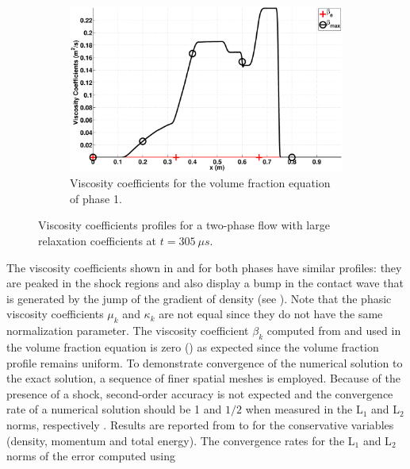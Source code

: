 \documentclass[preprint,10pt]{elsarticle}
\begin{document}
\begin{figure}[H]
        \begin{subfigure}[b]{0.495\textwidth}
                \centering
                \includegraphics[width=\textwidth]{figures/two_phases_liquid_beta.eps}
                \caption{Viscosity coefficients for the volume fraction equation of phase 1.}
                \label{fig:indp-phase-beta}
        \end{subfigure}        
        \caption{Viscosity coefficients profiles for a two-phase flow with large relaxation coefficients at $t=305 \ \mu s$.}\label{fig:indp-phase-visc-coeff}
\end{figure}
%
The viscosity coefficients shown in  and  for both phases have similar profiles: they are peaked in the shock regions and also display a bump in the contact wave that is generated by the jump of the gradient of density (see ). Note that the phasic viscosity coefficients $\mu_k$ and $\kappa_k$ are not equal since they do not have the same normalization parameter. The viscosity coefficient $\beta_k$ computed from  and used in the volume fraction equation is zero () as expected since the volume fraction profile remains uniform. 
To demonstrate convergence of the numerical solution to the exact solution, a sequence of finer spatial meshes is employed. Because 
of the presence of a shock, second-order accuracy is not expected and the convergence rate of a numerical solution 
should be 1 and $1/2$ when measured in the L$_1$ and L$_2$ norms, respectively \cite{banks-jeffrey, majda-andrew}. 
Results are reported from  to  for the conservative variables (density, 
momentum and total energy). The convergence rates for the L$_1$ and L$_2$ norms of the error computed using  
\end{document}
